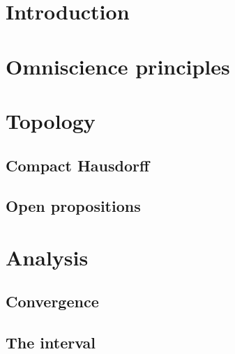 \documentclass{../util/zariski-small}
\begin{document}
%



\appendix
{}
\section*{Introduction}

%

\section{Omniscience principles}


\section{Topology}

\subsection{Compact Hausdorff}



\subsection{Open propositions}


\section{Analysis}

\subsection{Convergence}



\subsection{The interval}
%


\printbibliography
\end{document}
